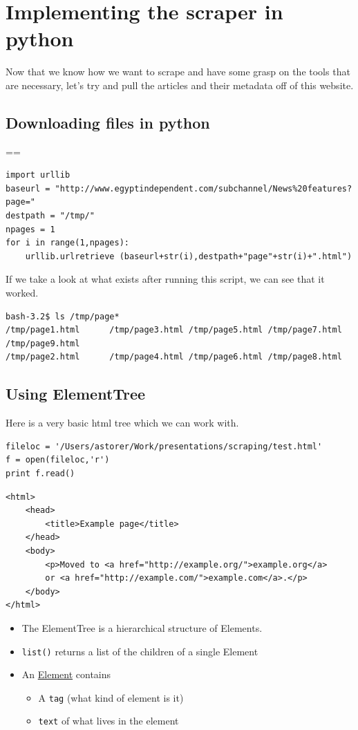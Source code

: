 \documentclass[11pt]{article}
\begin{document}
\section{Implementing the scraper in python}
\label{sec-5}

Now that we know how we want to scrape and have some grasp on the
tools that are necessary, let's try and pull the articles and their
metadata off of this website.
\subsection{Downloading files in python}
\label{sec-5-1}

==
\begin{verbatim}
import urllib
baseurl = "http://www.egyptindependent.com/subchannel/News%20features?page="
destpath = "/tmp/"
npages = 1
for i in range(1,npages):
    urllib.urlretrieve (baseurl+str(i),destpath+"page"+str(i)+".html")
\end{verbatim}

   If we take a look at what exists after running this script, we can
   see that it worked.


\begin{verbatim}
bash-3.2$ ls /tmp/page*
/tmp/page1.html      /tmp/page3.html /tmp/page5.html /tmp/page7.html /tmp/page9.html
/tmp/page2.html      /tmp/page4.html /tmp/page6.html /tmp/page8.html
\end{verbatim}
\subsection{Using ElementTree}
\label{sec-5-2}


   Here is a very basic html tree which we can work with.


\begin{verbatim}
fileloc = '/Users/astorer/Work/presentations/scraping/test.html'
f = open(fileloc,'r')
print f.read()
\end{verbatim}


\begin{verbatim}
<html>
    <head>
        <title>Example page</title>
    </head>
    <body>
        <p>Moved to <a href="http://example.org/">example.org</a>
        or <a href="http://example.com/">example.com</a>.</p>
    </body>
</html>
\end{verbatim}


\begin{itemize}
\item The ElementTree is a hierarchical structure of Elements.
\item \texttt{list()} returns a list of the children of a single Element
\item An \href{http://docs.python.org/library/xml.etree.elementtree.html#xml.etree.ElementTree.Element}{Element} contains
\begin{itemize}
\item A \texttt{tag} (what kind of element is it)
\item \texttt{text} of what lives in the element
\end{itemize}
\end{itemize}
\end{document}
